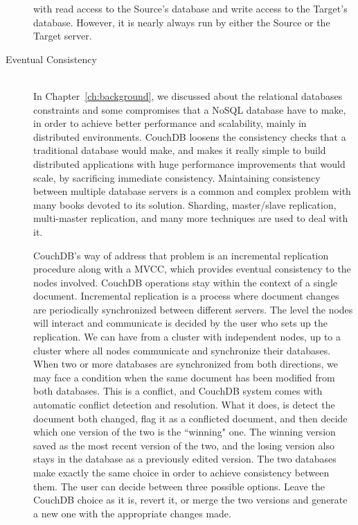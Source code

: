 \begin{description}
    with read access to the Source's database and write access to the Target's
    database. However, it is nearly always run by either the Source or the
    Target server.
  \item[Eventual Consistency]\label{item:eventual} \hfill \\
    In Chapter~\ref{ch:background}, we discussed about the relational databases
    constraints and some compromises that a NoSQL database have to make, in
    order to achieve better performance and scalability, mainly in distributed
    environments. CouchDB loosens the consistency checks that a traditional
    database would make, and makes it really simple to build distributed
    applications with huge performance improvements that would scale, by
    sacrificing immediate consistency. Maintaining consistency between multiple
    database servers is a common and complex problem with many books devoted to
    its solution. Sharding, master/slave replication, multi-master replication,
    and many more techniques are used to deal with it.

    CouchDB's way of address that problem is an incremental replication
    procedure along with a MVCC, which provides eventual consistency to the
    nodes involved. CouchDB operations stay within the context of a single
    document. Incremental
    replication is a process where document changes are periodically
    synchronized between different servers. The level the nodes will interact
    and communicate is decided by the user who sets up the replication. We can
    have from a cluster with independent nodes, up to a cluster where all nodes
    communicate and synchronize their databases. When two or more databases
    are synchronized from both directions, we may face a condition when the same
    document has been modified from both databases. This is a conflict, and
    CouchDB system comes with automatic conflict detection and resolution. What
    it does, is detect the document both changed, flag it as a conflicted
    document, and then decide which one version of the two is the ``winning"
    one. The winning version saved as the most recent version of the two, and
    the losing version also stays in the database as a previously edited
    version. The two databases make exactly the same choice in order to achieve
    consistency between them. The user can decide between three possible
    options. Leave the CouchDB choice as it is, revert it, or merge the two
    versions and generate a new one with the appropriate changes made.
\end{description}

